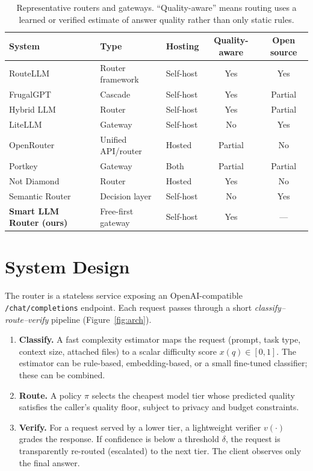 \documentclass[11pt]{article}
\begin{document}
\begin{table}[t]
\centering
\small
\caption{Representative routers and gateways. ``Quality-aware'' means routing
uses a learned or verified estimate of answer quality rather than only static
rules.}
\label{tab:landscape}
\begin{tabular}{@{}lllcc@{}}
\toprule
System & Type & Hosting & Quality-aware & Open source \\
\midrule
RouteLLM~\cite{routellm}          & Router framework   & Self-host   & Yes & Yes \\
FrugalGPT~\cite{frugalgpt}        & Cascade            & Self-host   & Yes & Partial \\
Hybrid LLM~\cite{hybridllm}       & Router             & Self-host   & Yes & Partial \\
LiteLLM~\cite{litellm}            & Gateway            & Self-host   & No  & Yes \\
OpenRouter~\cite{openrouter}      & Unified API/router & Hosted      & Partial & No \\
Portkey~\cite{portkey}            & Gateway            & Both        & Partial & Partial \\
Not Diamond~\cite{notdiamond}     & Router             & Hosted      & Yes & No \\
Semantic Router~\cite{semanticrouter} & Decision layer & Self-host   & No  & Yes \\
\textbf{Smart LLM Router (ours)}  & Free-first gateway & Self-host   & Yes & --- \\
\bottomrule
\end{tabular}
\end{table}

\section{System Design}
\label{sec:system}
The router is a stateless service exposing an OpenAI-compatible
\texttt{/chat/completions} endpoint. Each request passes through a short
\emph{classify--route--verify} pipeline (Figure~\ref{fig:arch}).

\begin{enumerate}
  \item \textbf{Classify.} A fast complexity estimator maps the request (prompt,
        task type, context size, attached files) to a scalar difficulty score
        $x(q)\in[0,1]$. The estimator can be rule-based, embedding-based, or a
        small fine-tuned classifier; these can be combined.
  \item \textbf{Route.} A policy $\pi$ selects the cheapest model tier whose
        predicted quality satisfies the caller's quality floor, subject to
        privacy and budget constraints.
  \item \textbf{Verify.} For a request served by a lower tier, a lightweight
        verifier $v(\cdot)$ grades the response. If confidence is below a
        threshold $\delta$, the request is transparently re-routed (escalated)
        to the next tier. The client observes only the final answer.
\end{enumerate}
\end{document}
